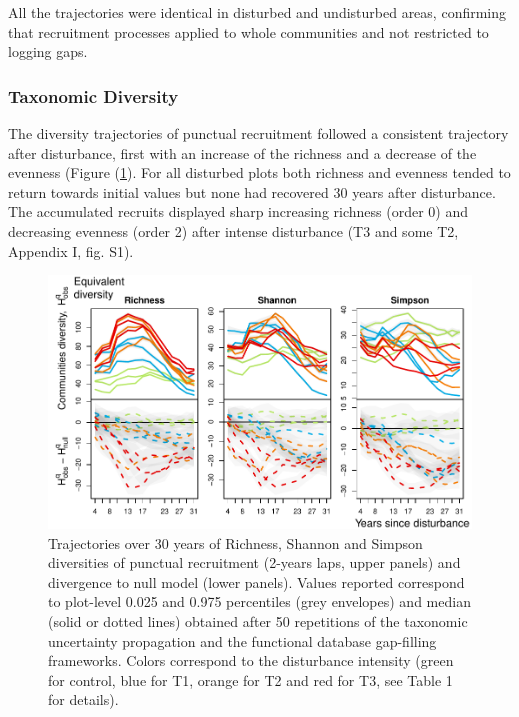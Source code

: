\documentclass[fleqn,10pt]{ArtEcoFoG} %
\begin{document}
All the trajectories were identical in disturbed and undisturbed areas,
confirming that recruitment processes applied to whole communities and
not restricted to logging gaps.

\subsubsection{Taxonomic Diversity}\label{taxonomic-diversity}

The diversity trajectories of punctual recruitment followed a consistent
trajectory after disturbance, first with an increase of the richness and
a decrease of the evenness (Figure (\ref{fig:DivTraj}). For all
disturbed plots both richness and evenness tended to return towards
initial values but none had recovered 30 years after disturbance. The
accumulated recruits displayed sharp increasing richness (order 0) and
decreasing evenness (order 2) after intense disturbance (T3 and some T2,
Appendix I, fig. S1).

\begin{figure}

{\centering \includegraphics[width=0.8\linewidth]{RecruitmentTrajectories_files/figure-latex/DivTraj-1} 

}

\caption{Trajectories over 30 years of Richness, Shannon and Simpson diversities of punctual  recruitment (2-years laps, upper panels) and divergence to null model (lower panels). Values reported correspond to plot-level 0.025 and 0.975 percentiles (grey envelopes) and median (solid or dotted lines) obtained after 50 repetitions of the taxonomic uncertainty propagation and the functional database gap-filling frameworks. Colors correspond to the disturbance intensity (green for control, blue for T1, orange for T2 and red for T3, see Table 1 for details).}\label{fig:DivTraj}
\end{figure}
\end{document}
